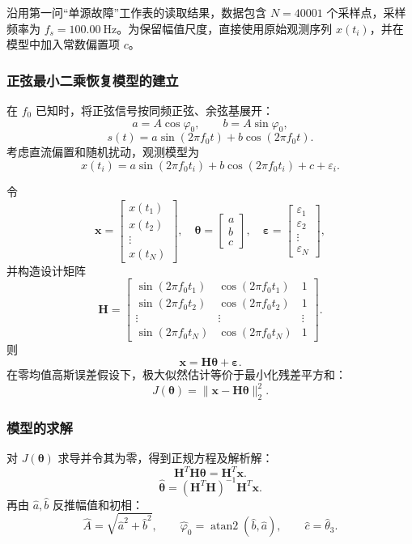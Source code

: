 \documentclass[UTF8,a4paper,12pt]{ctexart}
\numberwithin{figure}{section}
\numberwithin{table}{section}
\begin{document}
沿用第一问“单源故障”工作表的读取结果，数据包含 \(N=40001\) 个采样点，采样频率为 \(f_s=100.00\ \mathrm{Hz}\)。为保留幅值尺度，直接使用原始观测序列 \(x(t_i)\)，并在模型中加入常数偏置项 \(c\)。

\subsubsection{正弦最小二乘恢复模型的建立}

在 \(f_0\) 已知时，将正弦信号按同频正弦、余弦基展开：
\[
a=A\cos\varphi_0,\qquad b=A\sin\varphi_0,
\]
\[
s(t)=a\sin(2\pi f_0t)+b\cos(2\pi f_0t).
\]
考虑直流偏置和随机扰动，观测模型为
\[
x(t_i)=a\sin(2\pi f_0t_i)+b\cos(2\pi f_0t_i)+c+\varepsilon_i.
\]

令
\[
\mathbf{x}=\begin{bmatrix}x(t_1)\\x(t_2)\\\vdots\\x(t_N)\end{bmatrix},\quad
\boldsymbol{\theta}=\begin{bmatrix}a\\b\\c\end{bmatrix},\quad
\boldsymbol{\varepsilon}=\begin{bmatrix}\varepsilon_1\\\varepsilon_2\\\vdots\\\varepsilon_N\end{bmatrix},
\]
并构造设计矩阵
\[
\mathbf H=\begin{bmatrix}
\sin(2\pi f_0t_1)&\cos(2\pi f_0t_1)&1\\
\sin(2\pi f_0t_2)&\cos(2\pi f_0t_2)&1\\
\vdots&\vdots&\vdots\\
\sin(2\pi f_0t_N)&\cos(2\pi f_0t_N)&1
\end{bmatrix}.
\]
则
\[
\mathbf{x}=\mathbf H\boldsymbol{\theta}+\boldsymbol{\varepsilon}.
\]
在零均值高斯误差假设下，极大似然估计等价于最小化残差平方和：
\[
J(\boldsymbol{\theta})=\|\mathbf{x}-\mathbf H\boldsymbol{\theta}\|_2^2.
\]

\subsubsection{模型的求解}

对 \(J(\boldsymbol{\theta})\) 求导并令其为零，得到正规方程及解析解：
\[
\mathbf H^T\mathbf H\boldsymbol{\theta}=\mathbf H^T\mathbf{x}.
\]
\[
\hat{\boldsymbol{\theta}}=(\mathbf H^T\mathbf H)^{-1}\mathbf H^T\mathbf{x}.
\]
再由 \(\hat a,\hat b\) 反推幅值和初相：
\[
\hat A=\sqrt{\hat a^2+\hat b^2},
\qquad
\hat\varphi_0=\operatorname{atan2}(\hat b,\hat a),\qquad
\hat c=\hat\theta_3.
\]
\end{document}
